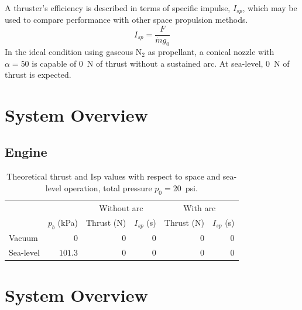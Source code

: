 \documentclass[journal]{IEEEtran}
\begin{document}
 A thruster's efficiency is described in terms of specific impulse, $I_{sp}$, which may be used to compare performance with other space propulsion methods.
 \begin{equation}
 \label{eq:isp}
   I_{sp}=\frac{F}{\dot{m} g_0}
 \end{equation}
In the ideal condition using gaseous N$_2$ as propellant, a conical nozzle with $\alpha=50$ is capable of \SI{0}{\newton} of thrust without a sustained arc.
At sea-level, \SI{0}{\newton} of thrust is expected.

\section{System Overview}

\subsection{Engine}
\begin{table}[hbp]
  \caption{Theoretical thrust and Isp values with respect to space and sea-level operation, total pressure $p_0= $\SI{20}{psi}.
\label{tab:theoretical-performance}
}
  \begin{tabular}{lrrrrr}
    \toprule
    & & \multicolumn{2}{c}{Without arc} & \multicolumn{2}{c}{With arc} \\
    & $p_b$ (\si{\kilo\pascal}) & Thrust (\si{\newton}) & $I_{sp}$ (\si{\second}) & Thrust (\si{\newton}) & $I_{sp}$ (\si{\second}) \\
    \midrule
    Vacuum & $0$ & $0$ & $0$ & $0$ & $0$ \\
    Sea-level & $101.3$ & $0$ & $0$ & $0$ & $0$  \\
    \bottomrule
  \end{tabular}
\end{table}


\section{System Overview}
\end{document}
